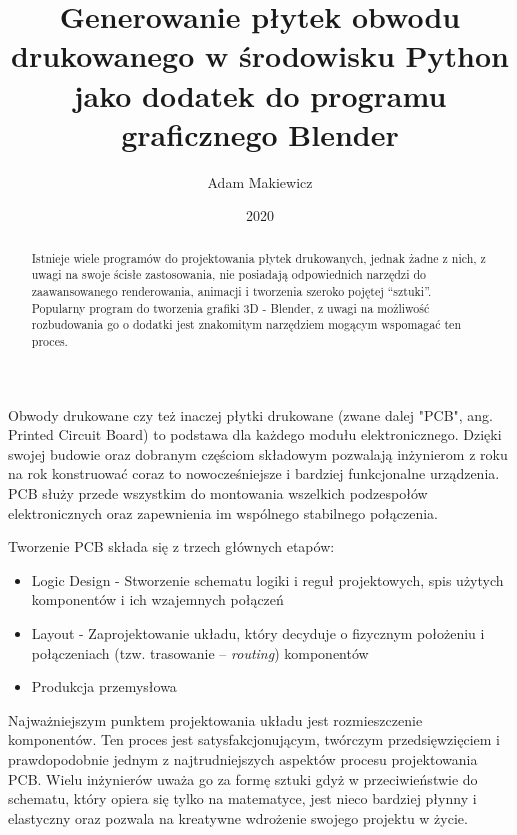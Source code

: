 \documentclass[brudnopis]{xmgr}
\author   {Adam Makiewicz}
\title    {Generowanie płytek obwodu drukowanego w środowisku Python jako dodatek do programu graficznego Blender}
\date     {2020}
\begin{document}
\begin{abstract}
Istnieje wiele programów do projektowania płytek drukowanych, jednak żadne z nich, z uwagi na swoje ścisłe zastosowania, nie posiadają odpowiednich narzędzi do zaawansowanego renderowania, animacji i tworzenia szeroko pojętej “sztuki”. Popularny program do tworzenia grafiki 3D - Blender, z uwagi na możliwość rozbudowania go o dodatki jest znakomitym narzędziem mogącym wspomagać ten proces.
\end{abstract}



\maketitle

\introduction

Obwody drukowane czy też inaczej płytki drukowane (zwane dalej "PCB", ang. Printed Circuit Board) to podstawa dla każdego modułu elektronicznego. Dzięki swojej budowie oraz dobranym częściom składowym pozwalają inżynierom z roku na rok konstruować coraz to nowocześniejsze i bardziej funkcjonalne urządzenia. PCB służy przede wszystkim do montowania wszelkich podzespołów elektronicznych oraz zapewnienia im wspólnego stabilnego połączenia.

Tworzenie PCB składa się z trzech głównych etapów: \cite{Abboud}

\begin{itemize}
\item
Logic Design - Stworzenie schematu logiki i reguł projektowych, spis użytych komponentów i ich wzajemnych połączeń
\item
Layout - Zaprojektowanie układu, który decyduje o fizycznym położeniu i połączeniach (tzw. trasowanie -- \emph{routing}) komponentów
\item
Produkcja przemysłowa
\end{itemize}
    
    Najważniejszym punktem projektowania układu jest rozmieszczenie komponentów. Ten proces jest satysfakcjonującym, twórczym przedsięwzięciem i prawdopodobnie jednym z najtrudniejszych aspektów procesu projektowania PCB. Wielu inżynierów uważa go za formę sztuki gdyż w przeciwieństwie do schematu, który opiera się tylko na matematyce, jest nieco bardziej płynny i elastyczny oraz pozwala na kreatywne wdrożenie swojego projektu w życie.
\end{document}
